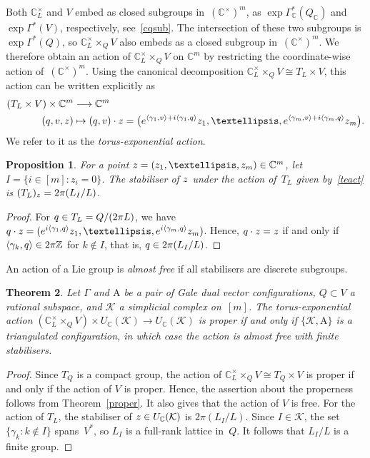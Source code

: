 \documentclass[a4paper]{amsart}
\newtheorem{theorem}{Theorem}[section]
\newtheorem{proposition}[theorem]{Proposition}
\theoremstyle{definition}
\theoremstyle{remark}
\numberwithin{equation}{section}
\def\C{\mathbb C}
\def\Z{\mathbb Z}
\def\sK{\mathcal K}
\newcommand{\mb}[1]{{\textbf {\textit#1}}}
\newcommand{\<}{\langle}
\renewcommand{\>}{\rangle}
\begin{document}
Both $\C^\times_L$ and $V$ embed as closed subgroups in~$(\C^\times)^m$, as 
$\exp\varGamma^*_\C(Q_\C)$ and $\exp\varGamma^*(V)$, respectively, see~\eqref{cqsub}. The intersection of these two subgroups is
$\exp\varGamma^*(Q)$, so $\C^\times_L\times_Q V$ also embeds as a closed subgroup in~$(\C^\times)^m$. We therefore obtain an action of 
$\C^\times_L\times_Q V$ on $\C^m$ by restricting the coordinate-wise action 
of~$(\C^\times)^m$. Using the canonical decomposition $\C^\times_L\times_Q V\cong T_L\times V$, this action can be written explicitly as
\begin{equation}\label{teact}
\begin{aligned}
  (T_L\times V)\times\C^m&\longrightarrow\C^m\\
  (\mb q,\mb v,\mb z)&\mapsto (\mb q,\mb v)\cdot\mb z=
  \bigl(e^{\langle\gamma_1,\mb v\rangle+i\langle\gamma_1,\mb q\rangle}z_1,
  \ldots,e^{\langle\gamma_m,\mb v\rangle+i\langle\gamma_m,\mb q\rangle}
  z_m\bigr).
\end{aligned}
\end{equation}
We refer to it as the \emph{torus-exponential action}.

\begin{proposition}\label{stabt}
For a point $\mb z=(z_1,\ldots,z_m)\in\C^m$, let $I=\{i\in[m]\colon z_i=0\}$.
The stabiliser of $\mb z$ under the action of~$T_L$ given by~\eqref{teact} is 
$(T_L)_{\mb z}=2\pi(L_I/L)$. 
\end{proposition}
\begin{proof}
For $\mb q\in T_L=Q/(2\pi L)$, we have
$
  \mb q\cdot\mb z=(e^{i\langle\gamma_1,\mb q\rangle}z_1,
  \ldots,e^{i\langle\gamma_m,\mb q\rangle}z_m)
$.
Hence, $\mb q\cdot\mb z=\mb z$ if and only if $\langle\gamma_k,\mb q\rangle\in 2\pi\Z$ for $k\notin I$, that is, $\mb q\in 2\pi(L_I/L)$.
\end{proof}

An action of a Lie group is \emph{almost free} if all stabilisers are discrete subgroups.

\begin{theorem}\label{teproper}
Let $\Gamma$ and $\mathrm A$ be a pair of Gale dual vector configurations,  $Q\subset V$ a rational subspace, and $\sK$ a simplicial complex on~$[m]$. The torus-exponential action $(\C^\times_L\times_Q V)\times U_\C(\sK)\to U_\C(\sK)$ is proper if and only if $\{\sK,\mathrm A\}$ is a triangulated configuration, in which case the action is almost free with finite stabilisers.
\end{theorem}
\begin{proof}
Since $T_Q$ is a compact group, the action of $\C^\times_L\times_Q V\cong T_Q\times V$ is proper if and only if the action of $V$ is proper. Hence, the assertion about the properness follows from Theorem~\ref{proper}. It also gives that the action of $V$ is free. For the action of $T_L$, the stabiliser of $\mb z\in U_\C(\sK)$ is $2\pi(L_I/L)$. Since $I\in\sK$, the set $\{\gamma_k\colon k\notin I\}$ spans~$V^*$, so $L_I$ is a full-rank lattice in~$Q$. It follows that $L_I/L$ is a finite group.
\end{proof}
\end{document}
